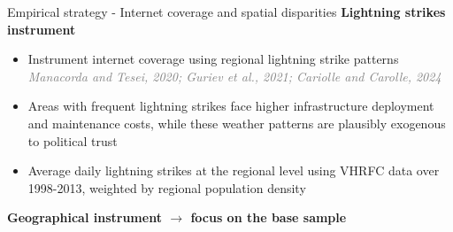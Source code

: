 \documentclass[10pt]{beamer}
\begin{document}
\begin{frame}{{\fontsize{13}{12}\selectfont
    Empirical strategy - Internet coverage and spatial disparities}}    
    \centering \textcolor{rougeprez}{\textbf{Lightning strikes instrument}}
    \vspace{1.5em}
    \begin{itemize}\setlength\itemsep{1em}
        \item Instrument internet coverage
        using regional lightning strike patterns \textcolor{gray}{\textit{Manacorda and Tesei, 2020; Guriev
                et al., 2021; Cariolle and Carolle, 2024}}\vfill
        \item Areas with frequent lightning strikes face higher infrastructure deployment and maintenance costs, while these weather patterns
                are plausibly exogenous to political trust\vfill
        \item Average daily lightning strikes at the regional level using VHRFC data over 1998-2013, weighted by regional population density\vfill
    \end{itemize}
    \vspace{1em}

\centering \textcolor{rougeprez}{\textbf{Geographical instrument $\rightarrow$ focus on the base sample}}
\end{frame}
\end{document}
